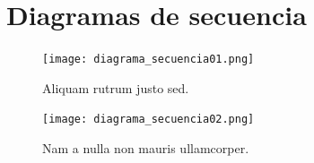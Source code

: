 \documentclass[titlepage,a4paper]{article}
\begin{document}
\begin{description}

\end{description}

\section{Diagramas de secuencia}\label{sec:diagramasdesecuencia}



\begin{figure}[H]
\centering
\texttt{[image: diagrama\_secuencia01.png]}
\caption{\label{fig:seq01}Aliquam rutrum justo sed.}
\end{figure}



\begin{figure}[H]
\centering
\texttt{[image: diagrama\_secuencia02.png]}
\caption{\label{fig:seq02}Nam a nulla non mauris ullamcorper.}
\end{figure}
\end{document}
